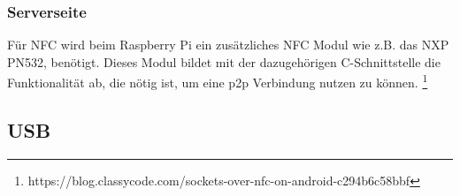    \subsubsection{Serverseite}
	    Für NFC wird beim Raspberry Pi ein zusätzliches NFC Modul wie z.B. das NXP PN532, benötigt. Dieses Modul bildet mit der dazugehörigen C-Schnittstelle \cite{nfcLib} die Funktionalität ab, die nötig ist, um eine p2p Verbindung nutzen zu können. \footnote{https://blog.classycode.com/sockets-over-nfc-on-android-c294b6c58bbf}
	    
    \subsection{USB}
